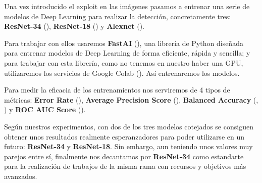 Una vez introducido el exploit en las imágenes pasamos a entrenar una serie de modelos de Deep Learning para realizar la detección, concretamente tres: \textbf{ResNet-34} (\cite{resnet34}), \textbf{ResNet-18} (\cite{resnet18}) y \textbf{Alexnet} (\cite{alexnet}).

Para trabajar con ellos usaremos \textbf{FastAI} (\cite{fastai}), una librería de Python diseñada para entrenar modelos de Deep Learning de forma eficiente, rápida y sencilla; y para trabajar con esta librería, como no tenemos en nuestro haber una \ac{GPU}, utilizaremos los servicios de Google Colab (\cite{google-colab}). Así entrenaremos los modelos.

Para medir la eficacia de los entrenamientos nos serviremos de 4 tipos de métricas: \textbf{Error Rate} (\cite{error-rate}), \textbf{Average Precision Score} (\cite{apscore}), \textbf{Balanced Accuracy} (\cite{balanced-accuracy}, \cite{balanced-accuracy-2}) y \textbf{ROC AUC Score} (\cite{roc-auc-score}).

Según nuestros experimentos, con dos de los tres modelos cotejados se consiguen obtener unos resultados realmente esperanzadores para poder utilizarse en un futuro: \textbf{ResNet-34} y \textbf{ResNet-18}. Sin embargo, aun teniendo unos valores muy parejos entre sí, finalmente nos decantamos por \textbf{ResNet-34} como estandarte para la realización de trabajos de la misma rama con recursos y objetivos más avanzados.

